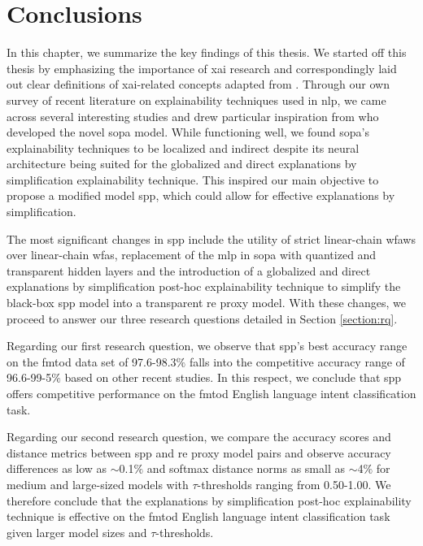 \chapter{Conclusions}

\label{chapter:conclusions}

In this chapter, we summarize the key findings of this thesis. We
started off this thesis by emphasizing the importance of \ac{xai} research and
correspondingly laid out clear definitions of \ac{xai}-related concepts adapted
from \citet{arrieta2020explainable}. Through our own survey of recent literature
on explainability techniques used in \ac{nlp}, we came across several
interesting studies and drew particular inspiration from
\citet{schwartz2018sopa} who developed the novel \ac{sopa} model. While functioning
well, we found \ac{sopa}'s explainability techniques to be localized and indirect
despite its neural architecture being suited for the globalized and direct
explanations by simplification explainability technique. This inspired our main
objective to propose a modified model \ac{spp}, which could allow for
effective explanations by simplification.

The most significant changes in \ac{spp} include the utility of strict
linear-chain \ac{wfaws} over linear-chain \ac{wfas}, replacement of the \ac{mlp}
in \ac{sopa} with quantized and transparent hidden layers and the introduction of a
globalized and direct explanations by simplification post-hoc explainability
technique to simplify the black-box \ac{spp} model into a transparent \ac{re}
proxy model. With these changes, we proceed to answer our three research
questions detailed in Section \ref{section:rq}.

Regarding our first research question, we observe that \ac{spp}'s best accuracy
range on the \ac{fmtod} data set of 97.6-98.3$\%$ falls into the competitive accuracy
range of 96.6-99-5$\%$ based on other recent studies. In this respect, we
conclude that \ac{spp} offers competitive performance on the \ac{fmtod} English
language intent classification task.

Regarding our second research question, we compare the accuracy scores and
distance metrics between \ac{spp} and \ac{re} proxy model pairs and observe accuracy
differences as low as $\sim$0.1$\%$ and softmax distance norms as small as $\sim$4$\%$ for
medium and large-sized models with $\tau$-thresholds ranging from 0.50-1.00. We
therefore conclude that the explanations by simplification post-hoc
explainability technique is effective on the \ac{fmtod} English language intent
classification task given larger model sizes and $\tau$-thresholds.

